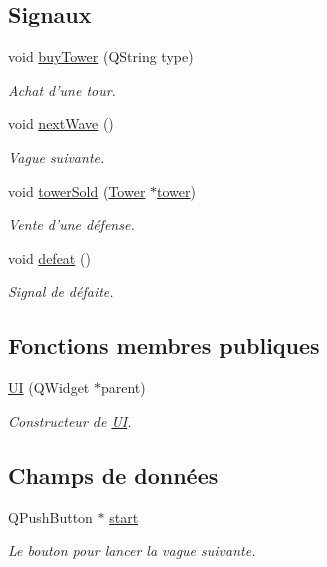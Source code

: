 \subsection*{Signaux}
\begin{DoxyCompactItemize}
\item 
void \hyperlink{classUI_aff34760681ad834d325122691afc8454}{buyTower} (QString type)
\begin{DoxyCompactList}\small\item\em Achat d'une tour. \end{DoxyCompactList}\item 
void \hyperlink{classUI_a63ad3c5f5b04203406c224ed01f50ddb}{nextWave} ()
\begin{DoxyCompactList}\small\item\em Vague suivante. \end{DoxyCompactList}\item 
void \hyperlink{classUI_a9c3ac46b4d04af5455a74f1034b44f26}{towerSold} (\hyperlink{classTower}{Tower} $\ast$\hyperlink{classUI_a352f80a494c8d3c1723f1248438ea912}{tower})
\begin{DoxyCompactList}\small\item\em Vente d'une défense. \end{DoxyCompactList}\item 
void \hyperlink{classUI_a6d4de01a54d50dfeb43e2b9d9af81dda}{defeat} ()
\begin{DoxyCompactList}\small\item\em Signal de défaite. \end{DoxyCompactList}\end{DoxyCompactItemize}
\subsection*{Fonctions membres publiques}
\begin{DoxyCompactItemize}
\item 
\hyperlink{classUI_a983ff4bdfc1543f6ea015c21526d70b6}{UI} (QWidget $\ast$parent)
\begin{DoxyCompactList}\small\item\em Constructeur de \hyperlink{classUI}{UI}. \end{DoxyCompactList}\end{DoxyCompactItemize}
\subsection*{Champs de données}
\begin{DoxyCompactItemize}
\item 
QPushButton $\ast$ \hyperlink{classUI_a02df204852b5bbb75015490337b1da5f}{start}
\begin{DoxyCompactList}\small\item\em Le bouton pour lancer la vague suivante. \end{DoxyCompactList}\end{DoxyCompactItemize}
